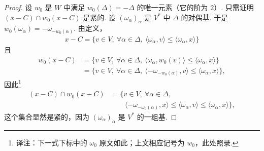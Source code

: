 \begin{proof}
设 $w_0$ 是 $W$ 中满足 $w_0(\Delta)=-\Delta$ 的唯一元素（它的阶为 $2$）. 只需证明 $(x-C)\cap w_0(x-C)$ 是紧的. 设 $(\omega_\alpha)_\alpha$ 是 $V^*$ 中 $\Delta$ 的对偶基. 于是 $w_0(\omega_\alpha)=-\omega_{-w_0(\alpha)}$. 由定义，
\begin{align*}
x-C=\{v\in V,\ \forall\alpha\in\Delta,\ \langle\omega_\alpha,v\rangle\leq\langle\omega_\alpha,x\rangle\}
\end{align*}
且
\begin{align*}
w_0(x-C)&=\{v\in V,\ \forall\alpha\in\Delta,\ \langle\omega_\alpha,w_0(v)\rangle\leq\langle\omega_\alpha,x\rangle\}\\
&=\{v\in V,\ \forall\alpha\in\Delta,\ \langle-\omega_{-w_0(\alpha)},v\rangle\leq\langle\omega_\alpha,x\rangle\},
\end{align*}
因此\footnote{译注：下一式下标中的 $\omega_0$ 原文如此；上文相应记号为 $w_0$，此处照录.}
\begin{align*}
(x-C)\cap w_0(x-C)
&=\{v\in V,\ \forall\alpha\in\Delta,\\
&\qquad\langle-\omega_{-\omega_0(\alpha)},x\rangle\leq\langle\omega_\alpha,v\rangle\leq\langle\omega_\alpha,x\rangle\},
\end{align*}
这个集合显然是紧的，因为 $(\omega_\alpha)_\alpha$ 是 $V^*$ 的一组基.
\end{proof}
